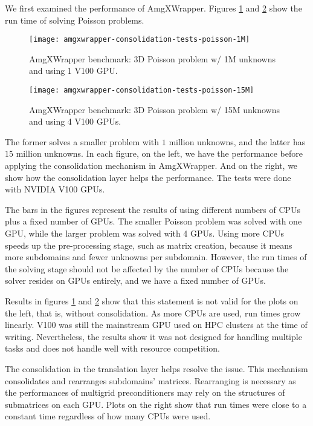 
We first examined the performance of AmgXWrapper.
Figures \ref{fig:amgxwrapper-cons-1M} and \ref{fig:amgxwrapper-cons-15M} show the run time of solving Poisson problems.
\begin{figure}[hbt!]%
    \texttt{[image: amgxwrapper-consolidation-tests-poisson-1M]}%
    \caption{AmgXWrapper benchmark: 3D Poisson problem w/ 1M unknowns and using 1 V100 GPU.}\label{fig:amgxwrapper-cons-1M}%
\end{figure}
\begin{figure}[hbt!]%
    \texttt{[image: amgxwrapper-consolidation-tests-poisson-15M]}%
    \caption{AmgXWrapper benchmark: 3D Poisson problem w/ 15M unknowns and using 4 V100 GPUs.}\label{fig:amgxwrapper-cons-15M}%
\end{figure}
The former solves a smaller problem with $1$ million unknowns, and the latter has $15$ million unknowns.
In each figure, on the left, we have the performance before applying the consolidation mechanism in AmgXWrapper.
And on the right, we show how the consolidation layer helps the performance.
The tests were done with NVIDIA V100 GPUs.

The bars in the figures represent the results of using different numbers of CPUs plus a fixed number of GPUs.
The smaller Poisson problem was solved with one GPU, while the larger problem was solved with 4 GPUs.
Using more CPUs speeds up the pre-processing stage, such as matrix creation, because it means more subdomains and fewer unknowns per subdomain.
However, the run times of the solving stage should not be affected by the number of CPUs because the solver resides on GPUs entirely, and we have a fixed number of GPUs.

Results in figures \ref{fig:amgxwrapper-cons-1M} and \ref{fig:amgxwrapper-cons-15M} show that this statement is not valid for the plots on the left, that is, without consolidation. 
As more CPUs are used, run times grow linearly.
V100 was still the mainstream GPU used on HPC clusters at the time of writing.
Nevertheless, the results show it was not designed for handling multiple tasks and does not handle well with resource competition.

The consolidation in the translation layer helps resolve the issue.
This mechanism consolidates and rearranges subdomains' matrices.
Rearranging is necessary as the performances of multigrid preconditioners may rely on the structures of submatrices on each GPU.
Plots on the right show that run times were close to a constant time regardless of how many CPUs were used.

